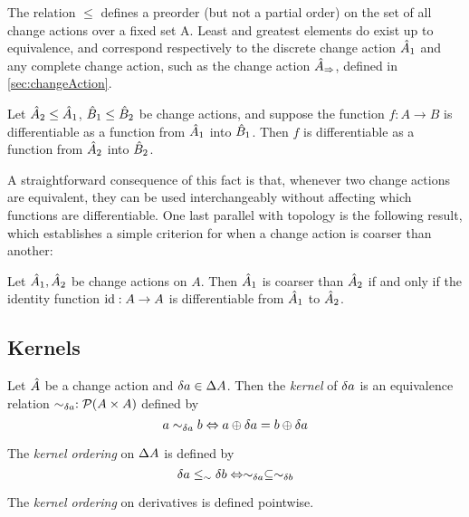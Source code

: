The relation $\leq$  defines a preorder (but not a partial order) on the set of all change actions 
over a fixed set A. Least and greatest elements do exist up to equivalence, and correspond
respectively to the discrete change action $\hat{A}_1$ and any complete change
action, such as the change action $\hat{A}_\Rightarrow$,
defined in \cref{sec:changeAction}.

\begin{prop}
  Let $\hat{A}_2 \leq \hat{A}_1$, $\hat{B}_1 \leq \hat{B}_2$ be change actions, and suppose
  the function $f : A \rightarrow B$ is differentiable as a function from $\hat{A}_1$ into
  $\hat{B}_1$. Then $f$ is differentiable as a function from $\hat{A}_2$ into $\hat{B}_2$.
\end{prop}

A straightforward consequence of this fact is that, whenever two change actions are equivalent,
they can be used interchangeably without affecting which functions are differentiable. One last parallel with topology
is the following result, which establishes a simple criterion for when a change action is coarser than
another:

\begin{prop}
  Let $\hat{A}_1, \hat{A}_2$ be change actions on $A$. Then $\hat{A}_1$ is coarser than $\hat{A}_2$
  if and only if the identity function $\operatorname{id} : A \rightarrow A$ is differentiable from $\hat{A}_1$ to
  $\hat{A}_2$.
\end{prop}

\subsection{Kernels}

\begin{defn}[Kernel]
  Let $\hat{A}$ be a change action and $\delta a \in \Delta A$. Then the
  \emph{kernel} of $\delta a$ is an equivalence relation $\sim_{\delta a}
  : \mathcal{P}(A \times A)$ defined by
  \begin{displaymath}
    a \sim_{\delta a} b \Leftrightarrow a \oplus \delta a = b \oplus \delta a
  \end{displaymath}

  The \emph{kernel ordering} on $\Delta A$ is defined by
  \begin{displaymath}
    \delta a \leq_\sim \delta b \Leftrightarrow \sim_{\delta a} \subseteq \sim_{\delta b}
  \end{displaymath}

  The \emph{kernel ordering} on derivatives is defined pointwise.
\end{defn}

